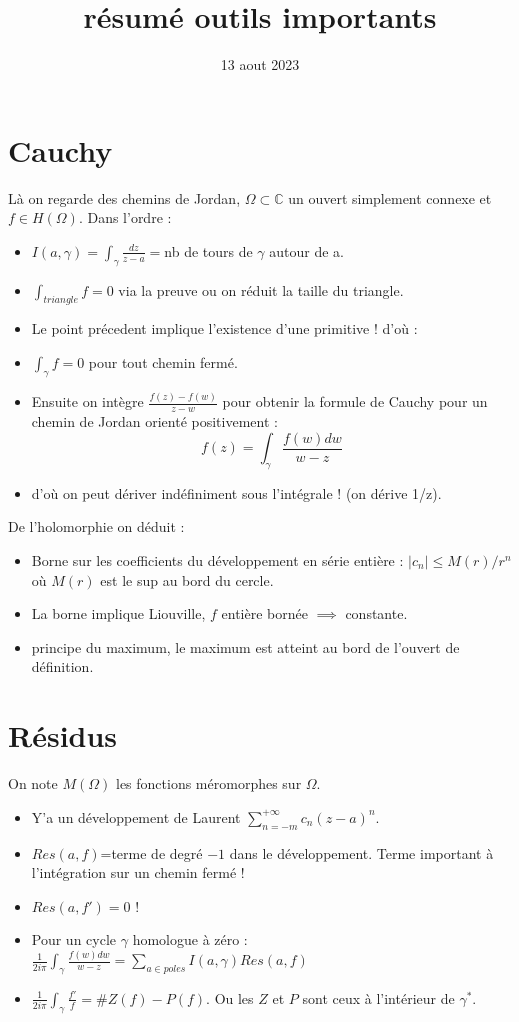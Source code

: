\documentclass[12pt]{article}
\title{résumé outils importants}
\date{13 aout 2023}
\newcommand{\C}{\mathbb{C}}
\begin{document}
\maketitle

\section{Cauchy}
Là on regarde des chemins de Jordan, $\Omega\subset\C$ un ouvert simplement connexe et $f\in H(\Omega)$. Dans l'ordre :
\begin{itemize}
    \item $I(a,\gamma)=\int_{\gamma}\frac{dz}{z-a}=$nb de tours de $\gamma$ autour de a.
    \item $\int_{triangle}f=0$ via la preuve ou on réduit la taille du triangle.
    \item Le point précedent implique l'existence d'une primitive ! d'où :
    \item $\int_{\gamma}f=0$ pour tout chemin fermé.
    \item Ensuite on intègre $\frac{f(z)-f(w)}{z-w}$ pour obtenir la formule de Cauchy pour un chemin de Jordan orienté positivement : $$f(z)=\int_{\gamma}\frac{f(w)dw}{w-z}$$
    \item d'où on peut dériver indéfiniment sous l'intégrale ! (on dérive 1/z).
\end{itemize}

De l'holomorphie on déduit :
\begin{itemize}
    \item Borne sur les coefficients du développement en série entière : $|c_n|\leq M(r)/r^n$ où $M(r)$ est le sup au bord du cercle.
    \item La borne implique Liouville, $f$ entière bornée $\implies$ constante.
    \item principe du maximum, le maximum est atteint au bord de l'ouvert de définition.
\end{itemize}

\section{Résidus}
On note $M(\Omega)$ les fonctions méromorphes sur $\Omega$.

\begin{itemize}
    \item Y'a un développement de Laurent $\sum_{n=-m}^{+\infty}c_n(z-a)^n$.
    \item $Res(a, f)$=terme de degré $-1$ dans le développement. Terme important à l'intégration sur un chemin fermé !
    \item $Res(a, f')=0$ ! 
    \item Pour un cycle $\gamma$ homologue à zéro : $\frac{1}{2i\pi}\int_{\gamma}\frac{f(w)dw}{w-z}=\sum_{a\in poles}I(a, \gamma)Res(a,f)$
    \item $\frac{1}{2i\pi}\int_{\gamma} \frac{f'}{f}=\# Z(f)-P(f)$. Ou les $Z$ et $P$ sont ceux à l'intérieur de $\gamma^*$.
\end{itemize}
\end{document}
